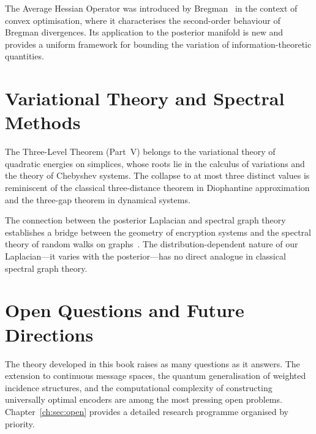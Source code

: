 The Average Hessian Operator was introduced by
Bregman~\cite{bregman1967relaxation} in the context of convex
optimisation, where it characterises the second-order behaviour
of Bregman divergences.  Its application to the posterior manifold
is new and provides a uniform framework for bounding the
variation of information-theoretic quantities.

\section{Variational Theory and Spectral Methods}\label{ch:sec:historical-variational}

The Three-Level Theorem (Part~V) belongs to the variational theory
of quadratic energies on simplices, whose roots lie in the
calculus of variations and the theory of Chebyshev systems.
The collapse to at most three distinct values is reminiscent of
the classical three-distance theorem in Diophantine approximation
and the three-gap theorem in dynamical systems.

The connection between the posterior Laplacian and spectral
graph theory establishes a bridge between the geometry of
encryption systems and the spectral theory of random walks on
graphs~\cite{chung1997spectral}.  The distribution-dependent
nature of our Laplacian---it varies with the posterior---has
no direct analogue in classical spectral graph theory.

\section{Open Questions and Future Directions}\label{ch:sec:historical-open}

The theory developed in this book raises as many questions as it
answers.  The extension to continuous message spaces, the quantum
generalisation of weighted incidence structures, and the
computational complexity of constructing universally optimal
encoders are among the most pressing open problems.
Chapter~\ref{ch:sec:open}
provides a detailed research programme organised by priority.